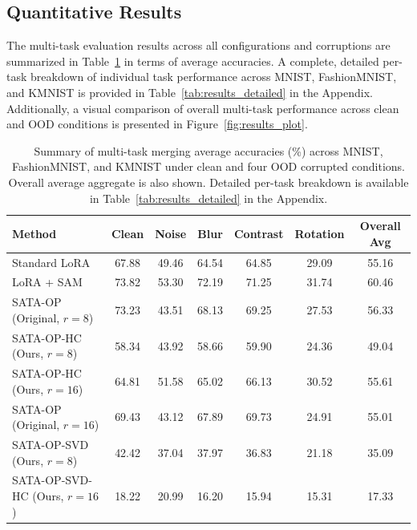 \documentclass{article}
\theoremstyle{plain}
\theoremstyle{definition}
\theoremstyle{remark}
\begin{document}
\subsection{Quantitative Results}

The multi-task evaluation results across all configurations and corruptions are summarized in Table~\ref{tab:results_summary} in terms of average accuracies. A complete, detailed per-task breakdown of individual task performance across MNIST, FashionMNIST, and KMNIST is provided in Table~\ref{tab:results_detailed} in the Appendix. Additionally, a visual comparison of overall multi-task performance across clean and OOD conditions is presented in Figure~\ref{fig:results_plot}.

\begin{table}[t]
\centering
\caption{Summary of multi-task merging average accuracies (\%) across MNIST, FashionMNIST, and KMNIST under clean and four OOD corrupted conditions. Overall average aggregate is also shown. Detailed per-task breakdown is available in Table~\ref{tab:results_detailed} in the Appendix.}
\label{tab:results_summary}
\vskip 0.15in
\begin{small}
\begin{sc}
\begin{tabular}{lcccccc}
\toprule
Method & Clean & Noise & Blur & Contrast & Rotation & Overall Avg \\
\midrule
Standard LoRA & 67.88 & 49.46 & 64.54 & 64.85 & 29.09 & 55.16 \\
LoRA + SAM & 73.82 & 53.30 & 72.19 & 71.25 & 31.74 & 60.46 \\
SATA-OP (Original, $r=8$) & 73.23 & 43.51 & 68.13 & 69.25 & 27.53 & 56.33 \\
SATA-OP-HC (Ours, $r=8$) & 58.34 & 43.92 & 58.66 & 59.90 & 24.36 & 49.04 \\
SATA-OP-HC (Ours, $r=16$) & 64.81 & 51.58 & 65.02 & 66.13 & 30.52 & 55.61 \\
SATA-OP (Original, $r=16$) & 69.43 & 43.12 & 67.89 & 69.73 & 24.91 & 55.01 \\
SATA-OP-SVD (Ours, $r=8$) & 42.42 & 37.04 & 37.97 & 36.83 & 21.18 & 35.09 \\
SATA-OP-SVD-HC (Ours, $r=16$) & 18.22 & 20.99 & 16.20 & 15.94 & 15.31 & 17.33 \\
\bottomrule
\end{tabular}
\end{sc}
\end{small}
\vskip -0.1in
\end{table}
\end{document}
